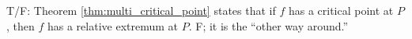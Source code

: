 {T/F: Theorem \ref{thm:multi_critical_point} states that if $f$ has a critical point at $P$, then $f$ has a relative extremum at $P$.
}
{
F; it is the ``other way around.''
}